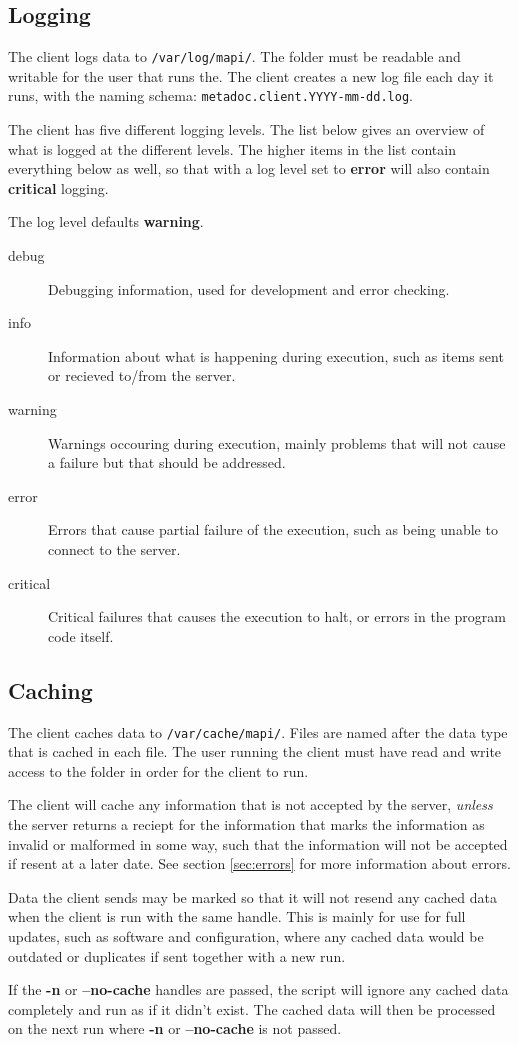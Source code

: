 \subsection{Logging}
\label{sec:logging}
The client logs data to \texttt{/var/log/mapi/}. The folder must be readable
and writable for the user that runs the.  The client creates a new log file
each day it runs, with the naming schema:
\texttt{metadoc.client.YYYY-mm-dd.log}. 

The client has five different logging levels. The list below gives an overview
of what is logged at the different levels. The higher items in the list contain
everything below as well, so that with a log level set to \textbf{error} will
also contain \textbf{critical} logging.

The log level defaults \textbf{warning}. 

\begin{description}
    \item[debug]    Debugging information, used for development and error
    checking.
    \item[info] Information about what is happening during execution, such as
    items sent or recieved to/from the server.
    \item[warning]  Warnings occouring during execution, mainly problems that
    will not cause a failure but that should be addressed.
    \item[error]    Errors that cause partial failure of the execution, such as
    being unable to connect to the server.
    \item[critical] Critical failures that causes the execution to halt, or
    errors in the program code itself.
\end{description}

\subsection{Caching}
\label{sec:caching}
The client caches data to \texttt{/var/cache/mapi/}. Files are named after the
data type that is cached in each file. The user running the client must have
read and write access to the folder in order for the client to run. 

The client will cache any information that is not accepted by the server, 
\textit{unless} the server returns a reciept for the information that marks the 
information as invalid or malformed in some way, such that the information will 
not be accepted if resent at a later date. See section \ref{sec:errors} for
more information about errors.

Data the client sends may be marked so that it will not resend any cached data
when the client is run with the same handle. This is mainly for use for full
updates, such as software and configuration, where any cached data would be
outdated or duplicates if sent together with a new run.

If the \textbf{-n} or \textbf{--no-cache} handles are passed, the script will
ignore any cached data completely and run as if it didn't exist. The cached
data will then be processed on the next run where \textbf{-n} or
\textbf{--no-cache} is not passed.
